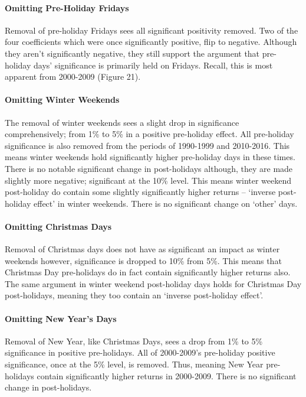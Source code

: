 \documentclass[11pt, english]{article}
\begin{document}
			\paragraph{Omitting Pre-Holiday Fridays}

			Removal of pre-holiday Fridays sees all significant positivity removed. Two of the four coefficients which were once significantly positive, flip to negative. Although they aren't significantly negative, they still support the argument that pre-holiday days' significance is primarily held on Fridays. Recall, this is most apparent from 2000-2009 (Figure 21).

			\paragraph{Omitting Winter Weekends}

			The removal of winter weekends sees a slight drop in significance comprehensively; from 1\% to 5\% in a positive pre-holiday effect. All pre-holiday significance is also removed from the periods of 1990-1999 and 2010-2016. This means winter weekends hold significantly higher pre-holiday days in these times. There is no notable significant change in post-holidays although, they are made slightly more negative; significant at the 10\% level. This means winter weekend post-holiday do contain some slightly significantly higher returns – `inverse post-holiday effect' in winter weekends. There is no significant change on `other' days.

			\paragraph{Omitting Christmas Days}

			Removal of Christmas days does not have as significant an impact as winter weekends however, significance is dropped to 10\% from 5\%. This means that Christmas Day pre-holidays do in fact contain significantly higher returns also. The same argument in winter weekend post-holiday days holds for Christmas Day post-holidays, meaning they too contain an `inverse post-holiday effect'.

			\paragraph{Omitting New Year’s Days}

			Removal of New Year, like Christmas Days, sees a drop from 1\% to 5\% significance in positive pre-holidays. All of 2000-2009’s pre-holiday positive significance, once at the 5\% level, is removed. Thus, meaning New Year pre-holidays contain significantly higher returns in 2000-2009. There is no significant change in post-holidays.
\end{document}
